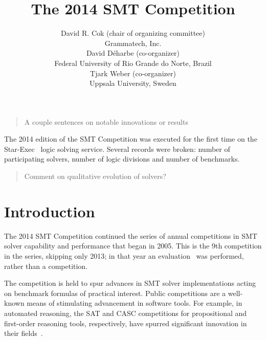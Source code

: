 \documentclass[twosize,11pt]{article}
\newcommand{\comment}[2]{\begin{quote}\sc #1\marginpar{\textcolor{red}{$\ast^{\mbox{#2}}$}}\end{quote}}
\newcommand{\tjark}[1]{\comment{#1}{TW}}
\newcommand{\davidd}[1]{\comment{#1}{DD}}
\newcommand{\tjarkx}[1]{\tjark{#1}}
\begin{document}
\title{The 2014 SMT Competition}

\author{
\name David R. Cok (chair of organizing committee)
 \\
\addr Grammatech, Inc. \\
\AND
\name David D\'{e}harbe (co-organizer)
 \\
\addr Federal University of Rio Grande do Norte, Brazil \\ 
\AND
\name Tjark Weber (co-organizer) \\
\addr Uppsala University, Sweden
}

\maketitle

\tjarkx{A couple sentences on notable innovations or results}
The 2014 edition of the SMT Competition was executed for the first time on the Star-Exec~\cite{DBLP:conf/cade/StumpST14} logic solving service. Several records were broken: number of participating solvers, number of logic divisions and number of benchmarks.

\davidd{Comment on qualitative evolution of solvers?}


\section{Introduction}
\label{sec:intro}

The 2014 SMT Competition continued the series of annual competitions in SMT solver capability and performance that began in 2005. This is the 9th competition in the series, skipping only 2013; in that year an evaluation~\cite{it:2014-017} was performed, rather than a competition.

The competition is held to spur advances in
SMT solver implementations acting on benchmark formulas of practical interest. Public competitions are
a well-known means of stimulating advancement in software tools. For example, in automated
reasoning, the SAT and CASC competitions for propositional and first-order reasoning tools, respectively,
have spurred significant innovation in their fields~\cite{leberre+03,PSS02}.
\end{document}

